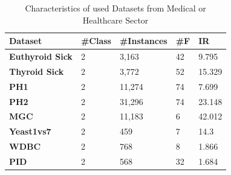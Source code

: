 \begin{table}[h]
    \centering
    \begin{tabular}{|p{}<{\centering}|p{}<{\centering}|p{}<{\centering}|p{}<{\centering}|p{}<{\centering}|}
    \hline
    \textbf{Dataset}        & \textbf{\#Class} & \textbf{\#Instances} & \textbf{\#F} & \textbf{IR} \\ \hline
    \textbf{Euthyroid Sick} & 2                & 3,163                & 42           & 9.795       \\ \hline
    \textbf{Thyroid Sick}   & 2                & 3,772                & 52           & 15.329      \\ \hline
    \textbf{PH1}            & 2                & 11,274               & 74           & 7.699       \\ \hline
    \textbf{PH2}            & 2                & 31,296               & 74           & 23.148      \\ \hline
    \textbf{MGC}            & 2                & 11,183               & 6            & 42.012      \\ \hline
    \textbf{Yeast1vs7}      & 2                & 459                  & 7            & 14.3        \\ \hline
    \textbf{WDBC}      & 2                & 768                  & 8            & 1.866        \\ \hline
    \textbf{PID}      & 2                & 568                  & 32            & 1.684        \\ \hline
    \end{tabular}
    \caption{Characteristics of used Datasets from Medical or Healthcare Sector}
    \label{tab6}
\end{table}

